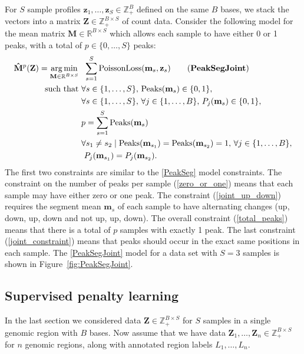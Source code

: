 \documentclass{article} %
\DeclareMathOperator*{\argmin}{arg\,min}
\DeclareMathOperator*{\Peaks}{Peaks}
\newcommand{\RR}{\mathbb R}
\newcommand{\ZZ}{\mathbb Z}
\begin{document}
For $S$ sample profiles $\mathbf z_1, \dots, \mathbf z_S\in\ZZ_+^B$
defined on the same $B$ bases, we stack the vectors into a matrix
$\mathbf Z\in\ZZ_+^{B \times S}$ of count data. Consider the following
model for the mean matrix $\mathbf M\in\RR^{B\times S}$ which allows
each sample to have either 0 or 1 peaks, with a total of $p\in\{0,
\dots, S\}$ peaks:
\begin{align}
  \label{PeakSegJoint}
  \mathbf{\hat M}^p(\mathbf Z)  =
  \argmin_{\mathbf M\in\RR^{B\times S}} &\ \ 
  \sum_{s=1}^S 
  \text{PoissonLoss}(\mathbf m_s, \mathbf z_s) 
  \tag{\textbf{PeakSegJoint}}
  \\
  \text{such that} &\ 
  \forall s\in\{1, \dots, S\},\, 
  \Peaks(\mathbf m_s)\in\{0, 1\},  
  \label{zero_or_one}
  \\
  &\ 
  \forall s\in\{1, \dots, S\},\,
  \forall j\in\{1, \dots, B\},\, P_j(\mathbf m_s) \in\{0, 1\},
  \label{joint_up_down}
  \\
  &\ 
  p = \sum_{s=1}^S \Peaks(\mathbf m_s)
  \label{total_peaks}
  \\
  &\ \forall s_1\neq s_2\mid
  \nonumber
  \Peaks(\mathbf m_{s_1})=\Peaks(\mathbf  m_{s_2})=1,\,
  \forall j\in\{1, \dots, B\},\\
  &\ \ P_j(\mathbf m_{s_1}) = P_j(\mathbf m_{s_2}).
  \label{joint_constraint}
\end{align}
The first two constraints are similar to the \ref{PeakSeg} model
constraints. The constraint on the number of peaks per sample
(\ref{zero_or_one}) means that each sample may have either zero or one
peak. The constraint (\ref{joint_up_down}) requires the segment mean
$\mathbf m_s$ of each sample to have alternating changes (up, down,
up, down and not up, up, down). The overall constraint
(\ref{total_peaks}) means that there is a total of $p$ samples with
exactly 1 peak. The last constraint (\ref{joint_constraint}) means
that peaks should occur in the exact same positions in each sample.
The \ref{PeakSegJoint} model for a data set with $S=3$ samples is
shown in Figure~\ref{fig:PeakSegJoint}.

\subsection{Supervised penalty learning}

In the last section we considered data $\mathbf Z\in\ZZ_+^{B\times S}$
for $S$ samples in a single genomic region with $B$ bases. Now assume
that we have data $\mathbf Z_1,\dots, \mathbf Z_n\in\ZZ_+^{B\times S}$
for $n$ genomic regions, along with annotated region labels
$L_1,\dots, L_n$. 
\end{document}
